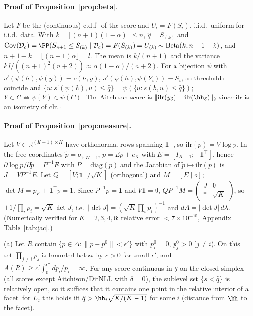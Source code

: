\paragraph{Proof of Proposition~\ref{prop:beta}.} Let $F$ be the (continuous) c.d.f.\ of the score and $U_i=F(S_i)$, i.i.d.\ uniform for i.i.d.\ data. With $k=\lceil(n+1)(1-\alpha)\rceil\le n$, $\hat q=S_{(k)}$ and $\mathrm{Cov}(\mathcal D_c)=\PP(S_{n+1}\le S_{(k)}\mid\mathcal D_c)=F(S_{(k)})=U_{(k)}\sim\mathrm{Beta}(k,n+1-k)$, and $n+1-k=\lfloor(n+1)\alpha\rfloor=l$. The mean is $k/(n+1)$ and the variance $k\,l/((n+1)^2(n+2))\approx\alpha(1-\alpha)/(n+2)$. For a bijection $\psi$ with $s'(\psi(h),\psi(y))=s(h,y)$, $s'(\psi(h),\psi(Y_i))=S_i$, so thresholds coincide and $\{u:s'(\psi(h),u)\le\hat q\}=\psi(\{u:s(h,u)\le\hat q\})$; $Y\in C\iff\psi(Y)\in\psi(C)$. The Aitchison score is $\|\mathrm{ilr}(y_\delta)-\mathrm{ilr}(\hh_\delta)\|_2$ since ilr is an isometry of clr.\hfill$\square$

\paragraph{Proof of Proposition~\ref{prop:measure}.} Let $V\in\mathbb R^{(K-1)\times K}$ have orthonormal rows spanning $\mathbf 1^\perp$, so $\mathrm{ilr}(p)=V\log p$. In the free coordinates $\tilde p=p_{1:K-1}$, $p=E\tilde p+e_K$ with $E=[I_{K-1};-\mathbf 1^\top]$, hence $\partial\log p/\partial\tilde p=P^{-1}E$ with $P=\mathrm{diag}(p)$ and the Jacobian of $\tilde p\mapsto\mathrm{ilr}(p)$ is $J=VP^{-1}E$. Let $Q=[V;\mathbf 1^\top/\sqrt K]$ (orthogonal) and $M=[E\mid p]$; $\det M=p_K+\mathbf 1^\top\tilde p=1$. Since $P^{-1}p=\mathbf 1$ and $V\mathbf 1=0$,
$QP^{-1}M=\begin{pmatrix}J&0\\ *&\sqrt K\end{pmatrix}$, so $\pm1/\prod_ip_i=\sqrt K\det J$, i.e.\ $|\det J|=(\sqrt K\prod_ip_i)^{-1}$ and $dA=|\det J|\,d\lambda$. (Numerically verified for $K=2,3,4,6$: relative error $<7\times10^{-10}$, Appendix Table~\ref{tab:jac}.)

(a) Let $R$ contain $\{p\in\Delta:\|p-p^0\|<\epsilon'\}$ with $p^0_i=0$, $p^0_j>0$ ($j\ne i$). On this set $\prod_{j\ne i}p_j$ is bounded below by $c>0$ for small $\epsilon'$, and $A(R)\ge c'\int_0^{\epsilon''}dp_i/p_i=\infty$. For any score continuous in $y$ on the closed simplex (all scores except Aitchison/DirNLL with $\delta=0$), the sublevel set $\{s<\hat q\}$ is relatively open, so it suffices that it contains one point in the relative interior of a facet; for $L_2$ this holds iff $\hat q>\hh_i\sqrt{K/(K-1)}$ for some $i$ (distance from $\hh$ to the facet).

